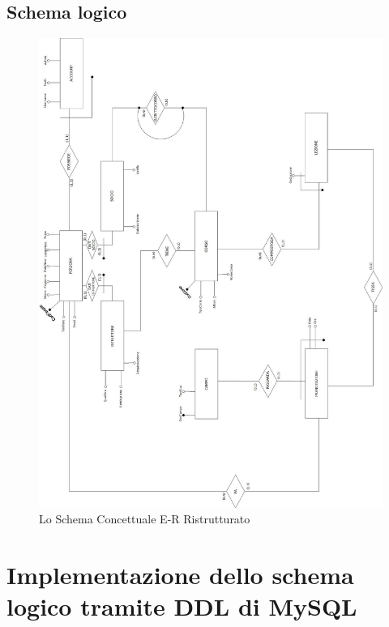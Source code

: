 \section{Schema logico}
\begin{figure}[H]
 \centering
  \includegraphics[width=\textwidth, height=\textheight]{Images/LOGICO.jpg}
\caption{Lo Schema Concettuale E-R Ristrutturato}
\end{figure}
\chapter{Implementazione dello schema logico tramite DDL di MySQL} 

